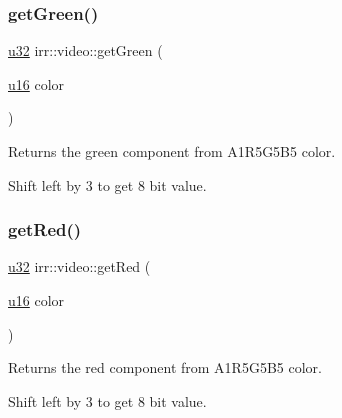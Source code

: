 \subsubsection{\texorpdfstring{get\+Green()}{getGreen()}}
{\footnotesize\ttfamily \hyperlink{namespaceirr_a0416a53257075833e7002efd0a18e804}{u32} irr\+::video\+::get\+Green (\begin{DoxyParamCaption}\item[{\hyperlink{namespaceirr_ae9f8ec82692ad3b83c21f555bfa70bcc}{u16}}]{color }\end{DoxyParamCaption})\hspace{0.3cm}{\ttfamily [inline]}}



Returns the green component from A1\+R5\+G5\+B5 color. 

Shift left by 3 to get 8 bit value. \mbox{\label{namespaceirr_1_1video_aa98234702c65c82ce29115b12e89dafe}} 
\subsubsection{\texorpdfstring{get\+Red()}{getRed()}}
{\footnotesize\ttfamily \hyperlink{namespaceirr_a0416a53257075833e7002efd0a18e804}{u32} irr\+::video\+::get\+Red (\begin{DoxyParamCaption}\item[{\hyperlink{namespaceirr_ae9f8ec82692ad3b83c21f555bfa70bcc}{u16}}]{color }\end{DoxyParamCaption})\hspace{0.3cm}{\ttfamily [inline]}}



Returns the red component from A1\+R5\+G5\+B5 color. 

Shift left by 3 to get 8 bit value. \mbox{\label{namespaceirr_1_1video_ad4d715752a69b052e582b06283513e49}} 

